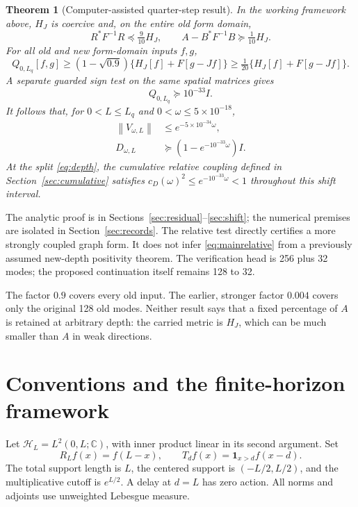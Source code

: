 \documentclass[11pt]{article}
\newtheorem{theorem}{Theorem}[section]
\theoremstyle{remark}\newtheorem{remark}[theorem]{Remark}
\newcommand{\HH}{\mathcal H}
\newcommand{\norm}[1]{\left\|#1\right\|}
\begin{document}
\begin{theorem}[Computer-assisted quarter-step result]\label{thm:main}
In the working framework above, $H_J$ is coercive and, on the entire old form domain,
\begin{equation}\label{eq:mainrelative}
 R^*F^{-1}R\preceq\tfrac9{10}H_J,\qquad
 A-B^*F^{-1}B\succeq\tfrac1{10}H_J.
\end{equation}
For all old and new form-domain inputs $f,g$,
\begin{equation}\label{eq:mainenergy}
 Q_{0,L_q}[f,g]\ge(1-\sqrt{0.9})\{H_J[f]+F[g-Jf]\}
 \ge\tfrac1{20}\{H_J[f]+F[g-Jf]\}.
\end{equation}
A separate guarded sign test on the same spatial matrices gives
\begin{equation}\label{eq:mainfloor}
 Q_{0,L_q}\succeq10^{-33}I.
\end{equation}
It follows that, for $0<L\le L_q$ and $0<\omega\le5\times10^{-18}$,
\begin{align}
 \norm{V_{\omega,L}}&\le e^{-5\times10^{-34}\omega},\label{eq:maincontract}\\
 D_{\omega,L}&\succeq(1-e^{-10^{-33}\omega})I.\label{eq:maindefect}
\end{align}
At the split \eqref{eq:depth}, the cumulative relative coupling defined in Section~\ref{sec:cumulative} satisfies $c_D(\omega)^2\le e^{-10^{-33}\omega}<1$ throughout this shift interval.
\end{theorem}

The analytic proof is in Sections~\ref{sec:residual}--\ref{sec:shift}; the numerical premises are isolated in Section~\ref{sec:records}. The relative test directly certifies a more strongly coupled graph form. It does not infer \eqref{eq:mainrelative} from a previously assumed new-depth positivity theorem. The verification head is 256 plus 32 modes; the proposed continuation itself remains 128 to 32.

The factor $0.9$ covers every old input. The earlier, stronger factor $0.004$ covers only the original 128 old modes. Neither result says that a fixed percentage of $A$ is retained at arbitrary depth: the carried metric is $H_J$, which can be much smaller than $A$ in weak directions.

\section{Conventions and the finite-horizon framework}\label{sec:framework}

Let $\HH_L=L^2(0,L;\mathbb C)$, with inner product linear in its second argument. Set
\[
 R_Lf(x)=f(L-x),\qquad T_df(x)=\mathbf1_{x>d}f(x-d).
\]
The total support length is $L$, the centered support is $(-L/2,L/2)$, and the multiplicative cutoff is $e^{L/2}$. A delay at $d=L$ has zero action. All norms and adjoints use unweighted Lebesgue measure.
\end{document}
